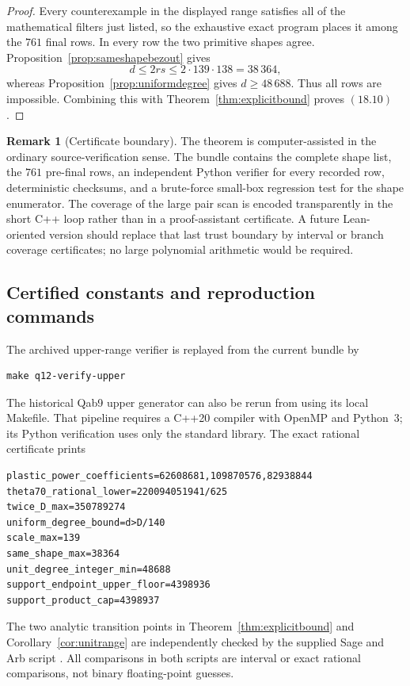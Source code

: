 \documentclass[11pt]{article}
\theoremstyle{definition}
\newtheorem{remark}[theorem]{Remark}
\begin{document}
\begin{proof}
Every counterexample in the displayed range satisfies all of the
mathematical filters just listed, so the exhaustive exact program places it
among the \(761\) final rows.  In every row the two primitive shapes agree.
Proposition~\ref{prop:sameshapebezout} gives
\[
 d\leq2rs\leq2\cdot139\cdot138=38\,364,
\]
whereas Proposition~\ref{prop:uniformdegree} gives \(d\geq48\,688\).  Thus
all rows are impossible.  Combining this with
Theorem~\ref{thm:explicitbound} proves \((18.10)\).
\end{proof}

\begin{remark}[Certificate boundary]
The theorem is computer-assisted in the ordinary source-verification sense.
The bundle contains the complete shape list, the \(761\) pre-final rows, an
independent Python verifier for every recorded row, deterministic checksums,
and a brute-force small-box regression test for the shape enumerator.  The
coverage of the large pair scan is encoded transparently in the short C++
loop rather than in a proof-assistant certificate.  A future Lean-oriented
version should replace that last trust boundary by interval or branch
coverage certificates; no large polynomial arithmetic would be required.
\end{remark}

\subsection{Certified constants and reproduction commands}

The archived upper-range verifier is replayed from the current bundle by
\begin{lstlisting}[basicstyle=\ttfamily\footnotesize]
make q12-verify-upper
\end{lstlisting}
The historical Qab9 upper generator can also be rerun from
 using its local Makefile.  That pipeline
requires a C++20 compiler with OpenMP and Python~3; its Python verification
uses only the standard library.  The exact rational certificate
 prints
\begin{lstlisting}[basicstyle=\ttfamily\scriptsize]
plastic_power_coefficients=62608681,109870576,82938844
theta70_rational_lower=220094051941/625
twice_D_max=350789274
uniform_degree_bound=d>D/140
scale_max=139
same_shape_max=38364
unit_degree_integer_min=48688
support_endpoint_upper_floor=4398936
support_product_cap=4398937
\end{lstlisting}
The two analytic transition points in Theorem~\ref{thm:explicitbound} and
Corollary~\ref{cor:unitrange} are independently checked by the supplied Sage
and Arb script .  All comparisons in
both scripts are interval or exact rational comparisons, not binary
floating-point guesses.
\end{document}
